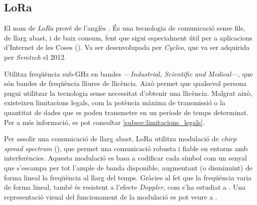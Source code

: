 \documentclass{tfgitic}[2024/07/01]
\begin{document}
\subsection{LoRa}
El nom de \emph{LoRa} prové de l'anglès . És una tecnologia de comunicació sense fils, de llarg abast, i de baix consum, fent que sigui especialment útil per a aplicacions d'Internet de les Coses (). Va ser desenvolupada per \emph{Cycleo}, que va ser adquirida per \emph{Semtech} el 2012.

Utilitza freqüència sub-GHz en bandes  ---\emph{Industrial, Scientific and Medical}---, que són bandes de freqüència lliures de llicència. Això permet que qualsevol persona pugui utilitzar la tecnologia sense necessitat d'obtenir una llicència. Malgrat això, existeixen limitacions legals, com la potència màxima de transmissió o la quantitat de dades que es poden transmetre en un període de temps determinat. Per a més informació, es pot consultar \ref{subsec:limitacions_legals}.

Per assolir una comunicació de llarg abast, LoRa utilitza modulació de \emph{chirp spread spectrum} (), que permet una comunicació robusta i fiable en entorns amb interferències. Aquesta modulació es basa a codificar cada símbol com un senyal que s'escampa per tot l'ample de banda disponible, augmentant (o disminuint) de forma lineal la freqüència al llarg del temps. Gràcies al fet que la freqüència varia de forma lineal, també és resistent a l'efecte \emph{Doppler}, com s'ha estudiat a \cite{doroshkin_experimental_2019}. Una representació visual del funcionament de la modulació  es pot veure a \cite{richard_wenner_lora_2017}.
\end{document}
